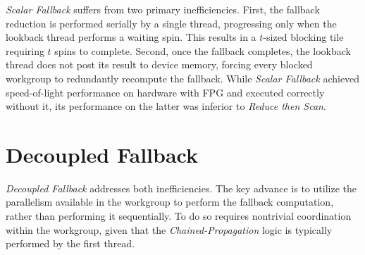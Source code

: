 \documentclass[sigconf]{acmart}
\begin{document}
\emph{Scalar Fallback} suffers from two primary inefficiencies. First, the fallback reduction is performed serially by a single thread, progressing only when the lookback thread performs a waiting spin. This results in a $t$-sized blocking tile requiring $t$ spins to complete. Second, once the fallback completes, the lookback thread does not post its result to device memory, forcing every blocked workgroup to redundantly recompute the fallback. While \emph{Scalar Fallback} achieved speed-of-light performance on hardware with FPG and executed correctly without it, its performance on the latter was inferior to \emph{Reduce then Scan}.

\section{Decoupled Fallback}
\emph{Decoupled Fallback} addresses both inefficiencies. The key advance is to utilize the parallelism available in the workgroup to perform the fallback computation, rather than performing it sequentially. To do so requires nontrivial coordination within the workgroup, given that the \emph{Chained-Propagation} logic is typically performed by the first thread.
\end{document}
